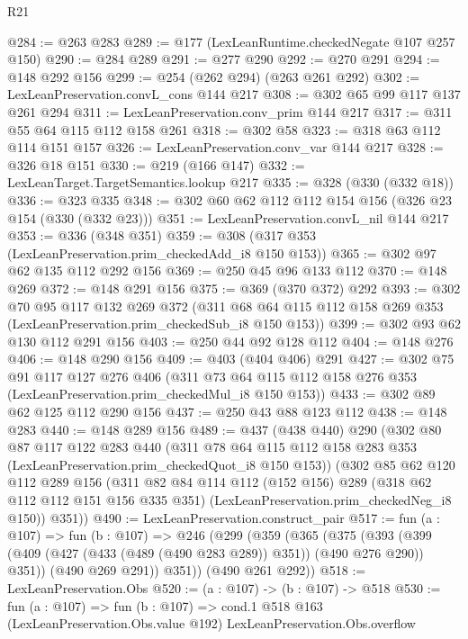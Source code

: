 \begin{lexlean}{R21}
\begin{coremodule}
{{{{{@284 := @263 @283
@289 := @177 (LexLeanRuntime.checkedNegate @107 @257 @150)
@290 := @284 @289
@291 := @277 @290
@292 := @270 @291
@294 := @148 @292 @156
@299 := @254 (@262 @294) (@263 @261 @292)
@302 := LexLeanPreservation.convL_cons @144 @217
@308 := @302 @65 @99 @117 @137 @261 @294
@311 := LexLeanPreservation.conv_prim @144 @217
@317 := @311 @55 @64 @115 @112 @158 @261
@318 := @302 @58
@323 := @318 @63 @112 @114 @151 @157
@326 := LexLeanPreservation.conv_var @144 @217
@328 := @326 @18 @151
@330 := @219 (@166 @147)
@332 := LexLeanTarget.TargetSemantics.lookup @217
@335 := @328 (@330 (@332 @18))
@336 := @323 @335
@348 := @302 @60 @62 @112 @112 @154 @156 (@326 @23 @154 (@330 (@332 @23)))
@351 := LexLeanPreservation.convL_nil @144 @217
@353 := @336 (@348 @351)
@359 := @308 (@317 @353 (LexLeanPreservation.prim_checkedAdd_i8 @150 @153))
@365 := @302 @97 @62 @135 @112 @292 @156
@369 := @250 @45 @96 @133 @112
@370 := @148 @269
@372 := @148 @291 @156
@375 := @369 (@370 @372) @292
@393 := @302
    @70
    @95
    @117
    @132
    @269
    @372
    (@311 @68 @64 @115 @112 @158 @269 @353 (LexLeanPreservation.prim_checkedSub_i8 @150 @153))
@399 := @302 @93 @62 @130 @112 @291 @156
@403 := @250 @44 @92 @128 @112
@404 := @148 @276
@406 := @148 @290 @156
@409 := @403 (@404 @406) @291
@427 := @302
    @75
    @91
    @117
    @127
    @276
    @406
    (@311 @73 @64 @115 @112 @158 @276 @353 (LexLeanPreservation.prim_checkedMul_i8 @150 @153))
@433 := @302 @89 @62 @125 @112 @290 @156
@437 := @250 @43 @88 @123 @112
@438 := @148 @283
@440 := @148 @289 @156
@489 := @437
    (@438 @440)
    @290
    (@302
      @80
      @87
      @117
      @122
      @283
      @440
      (@311 @78 @64 @115 @112 @158 @283 @353 (LexLeanPreservation.prim_checkedQuot_i8 @150 @153))
      (@302
        @85
        @62
        @120
        @112
        @289
        @156
        (@311
          @82
          @84
          @114
          @112
          (@152 @156)
          @289
          (@318 @62 @112 @112 @151 @156 @335 @351)
          (LexLeanPreservation.prim_checkedNeg_i8 @150))
        @351))
@490 := LexLeanPreservation.construct_pair
@517 := fun (a : @107) =>
  fun (b : @107) =>
  @246
    (@299
      (@359
        (@365
          (@375
            (@393 (@399 (@409 (@427 (@433 (@489 (@490 @283 @289)) @351)) (@490 @276 @290)) @351))
            (@490 @269 @291))
          @351))
      (@490 @261 @292))
@518 := LexLeanPreservation.Obs
@520 := (a : @107) -> (b : @107) -> @518
@530 := fun (a : @107) =>
  fun (b : @107) =>
  cond.{1} @518 @163 (LexLeanPreservation.Obs.value @192) LexLeanPreservation.Obs.overflow
}}}}}
\end{coremodule}
\end{lexlean}
